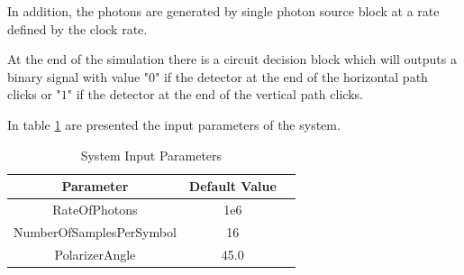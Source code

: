 In addition, the photons are generated by single photon source block at a rate defined by the clock rate.

At the end of the simulation there is a circuit decision block which will outputs a binary signal with value "$0$" \space if the detector at the end of the horizontal path clicks or "$1$" \space if the detector at the end of the vertical path clicks.

In table \ref{tb:inputparameters2} are presented the input parameters of the system.


\begin{table}[H]
\centering
\caption{System Input Parameters}
\label{tb:inputparameters2}
\begin{tabular}{|c|c|c|}
\hline
\textbf{Parameter}                      & \textbf{Default Value}                                       \\ \hline
RateOfPhotons                           & 1e6                                                          \\ \hline
NumberOfSamplesPerSymbol                & 16                                                           \\ \hline
PolarizerAngle                          & 45.0                                                         \\ \hline

\end{tabular}
\end{table}

